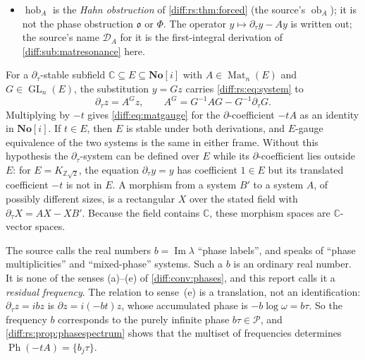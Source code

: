 \documentclass[11pt,letterpaper]{article}
\numberwithin{equation}{section}
\theoremstyle{definition}
\theoremstyle{remark}
\newcommand{\SC}{\mathbf{No}[i]}
\newcommand{\C}{\mathbb C}
\newcommand{\Z}{\mathbb Z}
\newcommand{\der}{\partial}
\newcommand{\Pcl}{\mathcal P}
\newcommand{\Obs}{\mathfrak o}
\newcommand{\Imm}{\operatorname{Im}}
\newcommand{\Mat}{\operatorname{Mat}}
\newcommand{\GL}{\operatorname{GL}}
\newcommand{\Ph}{\operatorname{Ph}}
\newcommand{\derT}{\der_{\tau}}
\newcommand{\hob}{\operatorname{hob}}
\begin{document}
\begin{convention}
\begin{itemize}[leftmargin=1.6em]
$D_{\mathrm{re}}=\operatorname{diag}(a_{\lambda}I_{d_{\lambda}})$ are real
diagonal matrices, $t^{D_{\mathrm{re}}}=\operatorname{diag}(t^{a_{\lambda}}I_{d_{\lambda}})$
is the real-monomial shear, $A^{\flat}=iD+N$ is the constant normal form,
$F=G_{0}G_{\natural}t^{D_{\mathrm{re}}}$ and $G_{\tau}=F\exp(\tau N)$ (the
source's $T$, $R_{0}$, $C$, $PHT$ and $Q$).
\item $\hob_{A}$ is the \emph{Hahn obstruction} of \cref{diff:rs:thm:forced}
(the source's $\operatorname{ob}_{A}$); it is not the phase obstruction $\Obs$
or $\Phi$. The operator $y\mapsto\derT y-Ay$ is written out; the source's name
$\mathcal D_{A}$ for it is the first-integral derivation of
\cref{diff:sub:matresonance} here.
\end{itemize}
For a $\derT$-stable subfield $\C\subseteq E\subseteq\SC$ with
$A\in\Mat_{n}(E)$ and $G\in\GL_{n}(E)$, the substitution $y=Gz$ carries \cref{diff:rs:eq:system} to
\begin{equation}\label{diff:rs:eq:gauge}
 \derT z=A^{G}z,\qquad A^{G}=G^{-1}AG-G^{-1}\derT G .
\end{equation}
Multiplying by $-t$ gives \cref{diff:eq:matgauge} for the
$\der$-coefficient $-tA$ as an identity in $\SC$. If $t\in E$, then $E$
is stable under both derivations, and $E$-gauge equivalence of the two
systems is the same in either frame. Without this hypothesis the
$\derT$-system can be defined over $E$ while its $\der$-coefficient
lies outside $E$: for $E=K_{\Z\sqrt2}$, the equation $\derT y=y$
has coefficient $1\in E$ but its translated coefficient $-t$ is not in $E$.
A morphism from a system $B'$ to a system $A$, of possibly different sizes,
is a rectangular $X$ over the stated field with $\derT X=AX-XB'$.
Because the field contains $\C$, these morphism spaces are $\C$-vector spaces.
\end{convention}

\begin{warning}
\label{diff:rs:warn:frequencies}
The source calls the real numbers $b=\Imm\lambda$ ``phase labels'', and speaks
of ``phase multiplicities'' and ``mixed-phase'' systems. Such a $b$ is an
ordinary real number. It is none of the senses (a)--(e) of
\cref{diff:conv:phases}, and this report calls it a \emph{residual frequency}.
The relation to sense~(e) is a translation, not an identification:
$\derT z=ibz$ is $\der z=i(-bt)z$, whose accumulated phase is
$-b\log\omega=b\tau$. So the frequency $b$ corresponds to the purely infinite
phase $b\tau\in\Pcl$, and \cref{diff:rs:prop:phasespectrum} shows that the
multiset of frequencies determines $\Ph(-tA)=\{b_{j}\tau\}$.
\end{warning}
\end{document}

